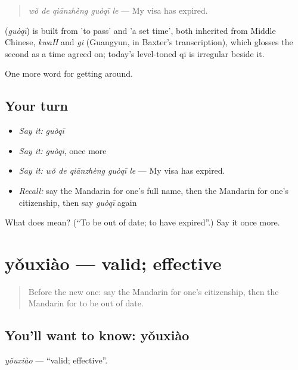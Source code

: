 \begin{quote}
\emph{wǒ de qiānzhèng guòqī le} — My visa has expired.
\end{quote}

\begin{cousinweb}
\textbf{} (\emph{guòqī}) is built from  'to pass' and  'a set time', both inherited from Middle Chinese, \emph{kwaH} and \emph{gi} (Guangyun, in Baxter's transcription), which glosses the second as a time agreed on; today's level-toned qī is irregular beside it.
\end{cousinweb}

\begin{grammarlens}[title={What you've built}]
One more word for getting around.
\end{grammarlens}

\subsection*{Your turn}
\begin{itemize}
\raggedright
  \item \emph{Say it:} \emph{guòqī}
  \item \emph{Say it:} \emph{guòqī}, once more
  \item \emph{Say it:} \emph{wǒ de qiānzhèng guòqī le} — My visa has expired.
  \item \emph{Recall:} say the Mandarin for one's full name, then the Mandarin for one's citizenship, then say \emph{guòqī} again
\end{itemize}

\begin{tcolorbox}[breakable,colback=teal!4,colframe=teal!35!black,title={Before you move on}]
What does  mean? (\textquotedblleft{}To be out of date; to have expired\textquotedblright{}.) Say it once more.
\end{tcolorbox}
\section[yǒuxiào]{yǒuxiào — valid; effective}

\label{lesson:ZH-C455-youxiao}



\begin{quote}
Before the new one: say the Mandarin for one's citizenship, then the Mandarin for to be out of date.
\end{quote}

\subsection*{You'll want to know: yǒuxiào}
\emph{yǒuxiào} — \textquotedblleft{}valid; effective\textquotedblright{}.

